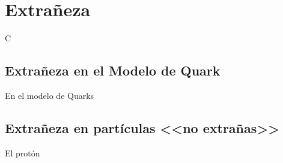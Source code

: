 \chapter{Extrañeza}\label{cap:strangeness}

C

\section{Extrañeza en el Modelo de Quark}\label{cap:strangeness_quark_model}

En el modelo de Quarks

\section{Extrañeza en partículas <<no extrañas>>}\label{cap:strangeness_quark_model}
El protón